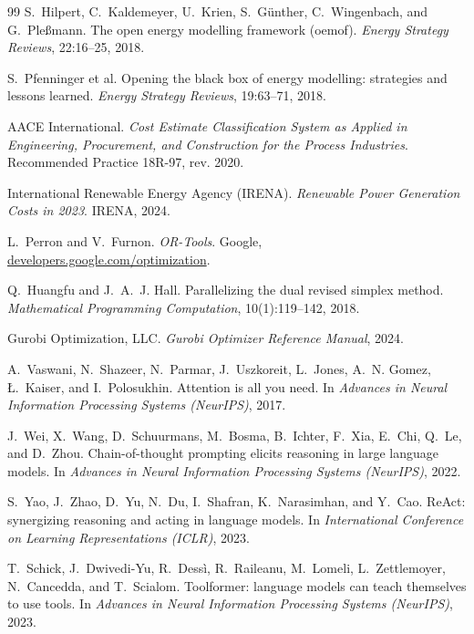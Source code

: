 \documentclass[12pt,a4paper,oneside]{book}
\begin{document}
\begin{thebibliography}{99}
S.~Hilpert, C.~Kaldemeyer, U.~Krien, S.~G\"{u}nther, C.~Wingenbach, and
G.~Ple\ss{}mann.
The open energy modelling framework (oemof).
\emph{Energy Strategy Reviews}, 22:16--25, 2018.

S.~Pfenninger et al.
Opening the black box of energy modelling: strategies and lessons learned.
\emph{Energy Strategy Reviews}, 19:63--71, 2018.

AACE International.
\emph{Cost Estimate Classification System as Applied in Engineering,
Procurement, and Construction for the Process Industries}.
Recommended Practice 18R-97, rev. 2020.

International Renewable Energy Agency (IRENA).
\emph{Renewable Power Generation Costs in 2023}.
IRENA, 2024.


L.~Perron and V.~Furnon.
\emph{OR-Tools}.
Google, \href{https://developers.google.com/optimization}{developers.google.com/optimization}.

Q.~Huangfu and J.~A.~J. Hall.
Parallelizing the dual revised simplex method.
\emph{Mathematical Programming Computation}, 10(1):119--142, 2018.

Gurobi Optimization, LLC.
\emph{Gurobi Optimizer Reference Manual}, 2024.


A.~Vaswani, N.~Shazeer, N.~Parmar, J.~Uszkoreit, L.~Jones, A.~N. Gomez,
{\L}.~Kaiser, and I.~Polosukhin.
Attention is all you need.
In \emph{Advances in Neural Information Processing Systems (NeurIPS)}, 2017.

J.~Wei, X.~Wang, D.~Schuurmans, M.~Bosma, B.~Ichter, F.~Xia, E.~Chi, Q.~Le, and
D.~Zhou.
Chain-of-thought prompting elicits reasoning in large language models.
In \emph{Advances in Neural Information Processing Systems (NeurIPS)}, 2022.

S.~Yao, J.~Zhao, D.~Yu, N.~Du, I.~Shafran, K.~Narasimhan, and Y.~Cao.
ReAct: synergizing reasoning and acting in language models.
In \emph{International Conference on Learning Representations (ICLR)}, 2023.

T.~Schick, J.~Dwivedi-Yu, R.~Dess\`{i}, R.~Raileanu, M.~Lomeli, L.~Zettlemoyer,
N.~Cancedda, and T.~Scialom.
Toolformer: language models can teach themselves to use tools.
In \emph{Advances in Neural Information Processing Systems (NeurIPS)}, 2023.


\end{thebibliography}
\end{document}
